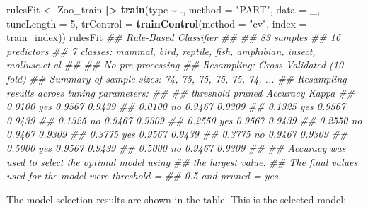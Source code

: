 \documentclass[
  notitlepage]{book}
\newenvironment{Shaded}{\begin{snugshade}}{\end{snugshade}}
\newcommand{\CommentTok}[1]{\textcolor[rgb]{0.56,0.35,0.01}{\textit{#1}}}
\newcommand{\DataTypeTok}[1]{\textcolor[rgb]{0.13,0.29,0.53}{#1}}
\newcommand{\DecValTok}[1]{\textcolor[rgb]{0.00,0.00,0.81}{#1}}
\newcommand{\ErrorTok}[1]{\textcolor[rgb]{0.64,0.00,0.00}{\textbf{#1}}}
\newcommand{\KeywordTok}[1]{\textcolor[rgb]{0.13,0.29,0.53}{\textbf{#1}}}
\newcommand{\NormalTok}[1]{#1}
\newcommand{\OperatorTok}[1]{\textcolor[rgb]{0.81,0.36,0.00}{\textbf{#1}}}
\newcommand{\StringTok}[1]{\textcolor[rgb]{0.31,0.60,0.02}{#1}}
\begin{document}
\begin{Shaded}
\begin{Highlighting}[]
\NormalTok{rulesFit \textless{}{-}}\StringTok{ }\NormalTok{Zoo\_train }\OperatorTok{|}\ErrorTok{\textgreater{}}\StringTok{ }\KeywordTok{train}\NormalTok{(type }\OperatorTok{\textasciitilde{}}\StringTok{ }\NormalTok{.,}
  \DataTypeTok{method =} \StringTok{"PART"}\NormalTok{,}
  \DataTypeTok{data =}\NormalTok{ \_,}
  \DataTypeTok{tuneLength =} \DecValTok{5}\NormalTok{,}
  \DataTypeTok{trControl =} \KeywordTok{trainControl}\NormalTok{(}\DataTypeTok{method =} \StringTok{"cv"}\NormalTok{, }
                           \DataTypeTok{index =}\NormalTok{ train\_index))}
\NormalTok{rulesFit}
\CommentTok{\#\# Rule{-}Based Classifier }
\CommentTok{\#\# }
\CommentTok{\#\# 83 samples}
\CommentTok{\#\# 16 predictors}
\CommentTok{\#\#  7 classes: \textquotesingle{}mammal\textquotesingle{}, \textquotesingle{}bird\textquotesingle{}, \textquotesingle{}reptile\textquotesingle{}, \textquotesingle{}fish\textquotesingle{}, \textquotesingle{}amphibian\textquotesingle{}, \textquotesingle{}insect\textquotesingle{}, \textquotesingle{}mollusc.et.al\textquotesingle{} }
\CommentTok{\#\# }
\CommentTok{\#\# No pre{-}processing}
\CommentTok{\#\# Resampling: Cross{-}Validated (10 fold) }
\CommentTok{\#\# Summary of sample sizes: 74, 75, 75, 75, 75, 74, ... }
\CommentTok{\#\# Resampling results across tuning parameters:}
\CommentTok{\#\# }
\CommentTok{\#\#   threshold  pruned  Accuracy  Kappa }
\CommentTok{\#\#   0.0100     yes     0.9567    0.9439}
\CommentTok{\#\#   0.0100     no      0.9467    0.9309}
\CommentTok{\#\#   0.1325     yes     0.9567    0.9439}
\CommentTok{\#\#   0.1325     no      0.9467    0.9309}
\CommentTok{\#\#   0.2550     yes     0.9567    0.9439}
\CommentTok{\#\#   0.2550     no      0.9467    0.9309}
\CommentTok{\#\#   0.3775     yes     0.9567    0.9439}
\CommentTok{\#\#   0.3775     no      0.9467    0.9309}
\CommentTok{\#\#   0.5000     yes     0.9567    0.9439}
\CommentTok{\#\#   0.5000     no      0.9467    0.9309}
\CommentTok{\#\# }
\CommentTok{\#\# Accuracy was used to select the optimal model using}
\CommentTok{\#\#  the largest value.}
\CommentTok{\#\# The final values used for the model were threshold =}
\CommentTok{\#\#  0.5 and pruned = yes.}
\end{Highlighting}
\end{Shaded}

The model selection results are shown in the table. This is the selected model:
\end{document}

